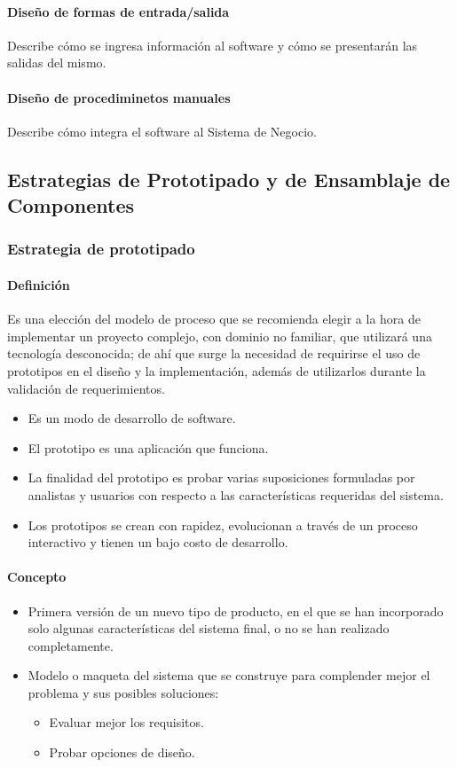 \paragraph{Diseño de formas de entrada/salida}
Describe cómo se ingresa información al software y cómo se presentarán las salidas del mismo.
\paragraph{Diseño de procediminetos manuales}
Describe cómo integra el software al Sistema de Negocio.
\subsection{Estrategias de Prototipado y de Ensamblaje de Componentes}
\subsubsection{Estrategia de prototipado}
\paragraph{Definición}
Es una elección del modelo de proceso que se recomienda elegir a la hora de implementar un proyecto complejo, con dominio no familiar, que utilizará una tecnología desconocida; de ahí que surge la necesidad de requirirse el uso de prototipos en el diseño y la implementación, además de utilizarlos durante la validación de requerimientos.
\begin{itemize}
\item Es un modo de desarrollo de software.
\item El prototipo es una aplicación que funciona.
\item La finalidad del prototipo es probar varias suposiciones formuladas por analistas y usuarios con respecto a las características requeridas del sistema.
\item Los prototipos se crean con rapidez, evolucionan a través de un proceso interactivo y tienen un bajo costo de desarrollo.
\end{itemize}
\paragraph{Concepto}
\begin{itemize}
\item Primera versión de un nuevo tipo de producto, en el que se han incorporado solo algunas características del sistema final, o no se han realizado completamente.
\item Modelo o maqueta del sistema que se construye para complender mejor el problema y sus posibles soluciones:
\begin{itemize}
\item Evaluar mejor los requisitos.
\item Probar opciones de diseño.
\end{itemize}
\end{itemize}
